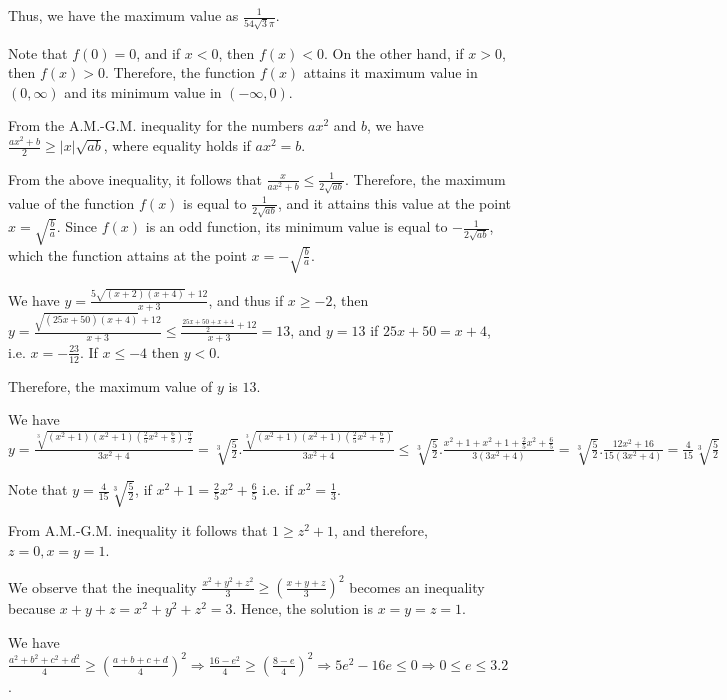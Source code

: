   Thus, we have the maximum value as $\frac{1}{54\sqrt{3}\pi}$.
\item Note that $f(0) = 0$, and if $x < 0$, then $f(x) < 0$. On the other hand, if $x > 0$, then $f(x) >
  0$. Therefore, the function $f(x)$ attains it maximum value in $(0, \infty)$ and its minimum value in
  $(-\infty, 0)$.

  From the A.M.-G.M. inequality for the numbers $ax^2$ and $b$, we have $\frac{ax^2 + b}{2}\geq
  |x|\sqrt{ab}$, where equality holds if $ax^2 = b$.

  From the above inequality, it follows that $\frac{x}{ax^2 + b}\leq \frac{1}{2\sqrt{ab}}$. Therefore, the
  maximum value of the function $f(x)$ is equal to $\frac{1}{2\sqrt{ab}}$, and it attains this value at the
  point $x = \sqrt{\frac{b}{a}}$. Since $f(x)$ is an odd function, its minimum value is equal to
  $-\frac{1}{2\sqrt{ab}}$, which the function attains at the point $x = -\sqrt{\frac{b}{a}}$.
\item We have $y = \frac{5\sqrt{(x + 2)(x + 4)} + 12}{x + 3}$, and thus if $x\geq -2$, then $y =
  \frac{\sqrt{(25x + 50)(x + 4)} + 12}{x + 3}\leq \frac{\frac{25x + 50 + x + 4}{2} + 12}{x + 3} = 13$, and
  $y = 13$ if $25x + 50 = x + 4$, i.e. $x = -\frac{23}{12}$. If $x \leq -4$ then $y < 0$.

  Therefore, the maximum value of $y$ is $13$.
\item We have $y = \displaystyle\frac{\sqrt[3]{(x^2 + 1)(x^2 + 1)\left(\frac{2}{5}x^2 + \frac{6}{5}\right).\frac{5}{2}}}{3x^2 + 4} =
  \sqrt[3]{\frac{5}{2}}.\frac{\sqrt[3]{(x^2 + 1)(x^2 + 1)\left(\frac{2}{5}x^2 + \frac{6}{5}\right)}}{3x^2 + 4}\leq
    \sqrt[3]{\frac{5}{2}}.\frac{x^2 + 1 + x^2 + 1 + \frac{2}{5}x^2 + \frac{6}{5}}{3(3x^2 + 4)} =
    \sqrt[3]{\frac{5}{2}}.\frac{12x^2 + 16}{15(3x^2 + 4)} = \frac{4}{15}\sqrt[3]{\frac{5}{2}}$

    Note that $y = \frac{4}{15}\sqrt[3]{\frac{5}{2}}$, if $x^2 + 1= \frac{2}{5}x^2 + \frac{6}{5}$ i.e. if
    $x^2 = \frac{1}{3}$.
\item From A.M.-G.M. inequality it follows that $1\geq z^2 + 1$, and therefore, $z = 0, x = y = 1$.
\item We observe that the inequality $\frac{x^2 + y^2 + z^2}{3}\geq \left(\frac{x + y + z}{3}\right)^2$
  becomes an inequality because $x + y + z = x^2 + y^2 + z^2 = 3$. Hence, the solution is $x = y = z = 1$.
\item We have $\frac{a^2 + b^2 + c^2 + d^2}{4}\geq \left(\frac{a + b + c + d}{4}\right)^2 \Rightarrow
  \frac{16 - e^2}{4}\geq \left(\frac{8 - e}{4}\right)^2\Rightarrow 5e^2 - 16e\leq 0 \Rightarrow 0\leq e\leq
  3.2$.

